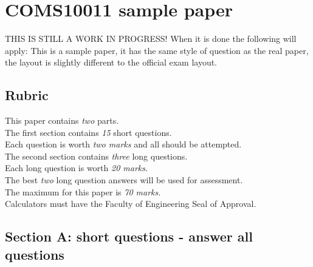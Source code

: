 \documentclass{article}
\begin{document}
\section*{COMS10011 sample paper}

THIS IS STILL A WORK IN PROGRESS! When it is done the following will
apply: This is a sample paper, it has the same style of question as
the real paper, the layout is slightly different to the official exam
layout.

\subsection*{Rubric}{
This paper contains \emph{two} parts. \\
The first section contains \emph {15} short questions.\\ 
Each question is worth \emph{two marks} and all should be attempted.\\
The second section contains \emph {three} long questions.\\
Each long question is worth \emph{20 marks}.\\
The best \emph{two} long question answers will be used for assessment. \\
The maximum for this paper is \emph{70 marks}. \\
Calculators must have the Faculty of Engineering Seal of Approval.}


\subsection*{Section A: short questions - answer all questions}
\end{document}
